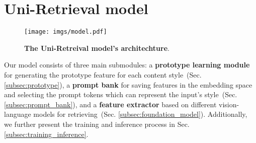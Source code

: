\vspace{-0.5em}
\section{Uni-Retrieval model}
\vspace{-0.5em}

\begin{figure*}[!t]
  \centering
   \texttt{[image: imgs/model.pdf]}
   \vspace{-3mm}
   \caption{\textbf{The Uni-Retreival model's architechture}.}
   \label{fig:model}
   \vspace{-5mm}
\end{figure*}


Our model consists of three main submodules: a \textbf{prototype learning module} for generating the prototype feature for each content style~(Sec. {\color{red}\ref{subsec:prototype}}), a \textbf{prompt bank} for saving features in the embedding space and selecting the prompt tokens which can represent the input's style~(Sec. {\color{red}\ref{subsec:prompt_bank}}), and a \textbf{feature extractor} based on different vision-language models for retrieving~(Sec.  {\color{red}\ref{subsec:foundation_model}}). Additionally, we further present the training and inference process in Sec. {\color{red}\ref{subsec:training_inference}}.

